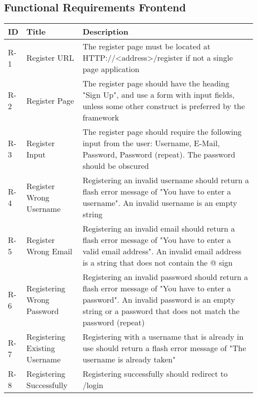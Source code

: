 \documentclass[main.tex]{subfiles}
\begin{document}
\subsection{Functional Requirements Frontend}
\label{appendix:functional-requirements}
\begin{table*}[h]
    \centering
    \begin{tabular}{|m{1cm}|m{3cm}|m{12cm}|}

        \hline
        ID & Title & Description \\
        \hline
        R-1 & Register URL & The register page must be located at HTTP://<address>/register if not a single page application \\
        \hline
        R-2 & Register Page & The register page should have the heading "Sign Up", and use a form with input fields, unless some other construct is preferred by the framework \\
        \hline
        R-3 & Register Input & The register page should require the following input from the user: Username, E-Mail, Password, Password (repeat). The password should be obscured \\
        \hline
        R-4 & Register Wrong Username & Registering an invalid username should return a flash error message of "You have to enter a username". An invalid username is an empty string \\
        \hline
        R-5 & Register Wrong Email & Registering an invalid email should return a flash error message of "You have to enter a valid email address". An invalid email address is a string that does not contain the @ sign \\
        \hline
        R-6 & Registering Wrong Password & Registering an invalid password should return a flash error message of "You have to enter a password". An invalid password is an empty string or a password that does not match the password (repeat) \\
        \hline
        R-7 & Registering Existing Username & Registering with a username that is already in use should return a flash error message of "The username is already taken" \\
        \hline
        R-8 & Registering Successfully & Registering successfully should redirect to /login \\
        \hline

        

\end{tabular}
\end{table*}
\end{document}
